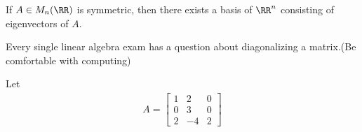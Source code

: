 \documentclass[11pt]{scrartcl}
\begin{document}
\begin{theorem}
	If $A \in M_n(\RR)$ is symmetric, then there exists a basis of $\RR^n$ consisting of eigenvectors of $A$.
\end{theorem}

Every single linear algebra exam has a question about diagonalizing a matrix.(Be comfortable with computing)

\begin{example}
	Let 
	\begin{align*}
	A = 
	\begin{bmatrix}
	1 & 2 & 0\\
	0 & 3 & 0\\
	2 & -4 & 2
	\end{bmatrix}
	\end{align*}
\end{example}
\end{document}
